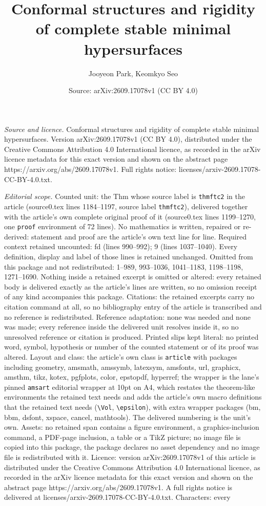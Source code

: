 \documentclass[10pt,a4paper]{amsart}
\title[Conformal structures and rigidity of complete stable minimal]{Conformal structures and rigidity of complete stable minimal hypersurfaces}
\author{Jooyeon Park, Keomkyo Seo}
\date{Source: arXiv:2609.17078v1 (CC BY 4.0)}
\begin{document}
\maketitle

\noindent\emph{Source and licence.} Conformal structures and rigidity of complete stable minimal hypersurfaces. Version arXiv:2609.17078v1 (CC BY 4.0), distributed under the Creative Commons Attribution 4.0 International licence, as recorded in the arXiv licence metadata for this exact version and shown on the abstract page https://arxiv.org/abs/2609.17078v1. Full rights notice: licenses/arxiv-2609.17078-CC-BY-4.0.txt.\par\smallskip

\noindent\textit{Editorial scope.} Counted unit: the Thm whose source label is \texttt{thmftc2} in the article (source0.tex lines 1184--1197, source label \texttt{thmftc2}), delivered together with the article's own complete original proof of it (source0.tex lines 1199--1270, one \texttt{proof} environment of 72 lines). No mathematics is written, repaired or re-derived: statement and proof are the article's own text line for line. Required context retained uncounted: fd (lines 990--992); 9 (lines 1037--1040). Every definition, display and label of those lines is retained unchanged. Omitted from this package and not redistributed: 1--989, 993--1036, 1041--1183, 1198--1198, 1271--1690. Nothing inside a retained excerpt is omitted or altered: every retained body is delivered exactly as the article's lines are written, so no omission receipt of any kind accompanies this package. Citations: the retained excerpts carry no citation command at all, so no bibliography entry of the article is transcribed and no reference is redistributed. Reference adaptation: none was needed and none was made; every reference inside the delivered unit resolves inside it, so no unresolved reference or citation is produced. Printed slips kept literal: no printed word, symbol, hypothesis or number of the counted statement or of its proof was altered. Layout and class: the article's own class is \texttt{article} with packages including geometry, amsmath, amssymb, latexsym, amsfonts, url, graphicx, amsthm, tikz, kotex, pgfplots, color, epstopdf, hyperref; the wrapper is the lane's pinned \texttt{amsart} editorial wrapper at 10pt on A4, which restates the theorem-like environments the retained text needs and adds the article's own macro definitions that the retained text needs (\texttt{\textbackslash Vol}, \texttt{\textbackslash epsilon}), with extra wrapper packages (bm, bbm, dsfont, xspace, cancel, mathtools). The delivered numbering is the unit's own. Assets: no retained span contains a figure environment, a graphics-inclusion command, a PDF-page inclusion, a table or a TikZ picture; no image file is copied into this package, the package declares no asset dependency and no image file is redistributed with it. Licence: version arXiv:2609.17078v1 of this article is distributed under the Creative Commons Attribution 4.0 International licence, as recorded in the arXiv licence metadata for this exact version and shown on the abstract page https://arxiv.org/abs/2609.17078v1. A full rights notice is delivered at licenses/arxiv-2609.17078-CC-BY-4.0.txt. Characters: every 
\end{document}
